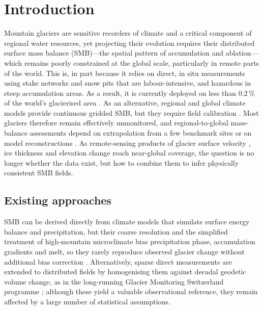 \section{Introduction}\label{sec:intro}

Mountain glaciers are sensitive recorders of climate and a critical component of regional water resources, yet projecting their evolution requires their distributed surface mass balance (SMB)---the spatial pattern of accumulation and 
ablation---which remains poorly constrained at the global scale, particularly in remote parts of the world. This is, in part because it relies on direct, in situ measurements using stake networks and snow pits that are labour-intensive, and hazardous in steep accumulation areas. As a result, it is currently deployed on less than 0.2\,\% of the world's glacierised area \citep{cogley2011}. As an alternative, regional and global climate models provide continuous gridded SMB, but they require field calibration 
\citep{radic2014, marzeion2012}. Most glaciers therefore remain effectively unmonitored, and regional-to-global mass-balance assessments depend on extrapolation from a few benchmark sites or on model reconstructions \citep{hugonnet2021, zemp2019}. As remote-sensing products of glacier surface
velocity \citep{millan2022}, ice thickness \citep{farinotti2019, millan2022} and
elevation change \citep{hugonnet2021, beraud2023} reach near-global coverage, the
question is no longer whether the data exist, but how to combine them to infer
physically consistent SMB fields.

\subsection{Existing approaches}\label{sec:sota}

SMB can be derived directly from climate models that simulate surface energy balance and precipitation, but their coarse resolution and the simplified treatment of high-mountain microclimate bias precipitation phase, accumulation gradients and melt, so they rarely reproduce observed glacier change without additional bias correction \citep{marzeion2012, rounce2020}. Alternatively, sparse direct measurements are extended to distributed fields by homogenising them against decadal geodetic volume change, as in the long-running Glacier Monitoring Switzerland programme \citep[GLAMOS;][]{glamos}; although these yield a valuable observational reference, they remain affected by a large number of statistical assumptions.

